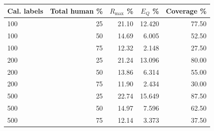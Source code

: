 \begin{tabular}{@{}lrrrr@{}}
\toprule
Cal. labels & Total human \% & $R_{\max}$ \% & $E_Q$ \% & Coverage \% \\
\midrule
100 & 25 & 21.10 & 12.420 & 77.50 \\
100 & 50 & 14.69 & 6.005 & 52.50 \\
100 & 75 & 12.32 & 2.148 & 27.50 \\
200 & 25 & 21.24 & 13.096 & 80.00 \\
200 & 50 & 13.86 & 6.314 & 55.00 \\
200 & 75 & 11.90 & 2.434 & 30.00 \\
500 & 25 & 22.74 & 15.649 & 87.50 \\
500 & 50 & 14.97 & 7.596 & 62.50 \\
500 & 75 & 12.14 & 3.373 & 37.50 \\
\bottomrule
\end{tabular}
